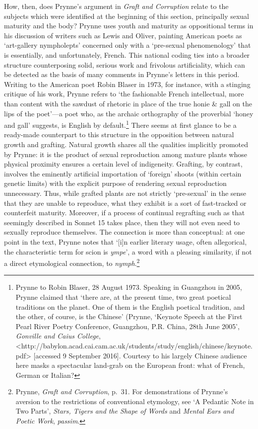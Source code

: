 \documentclass[]{article}
\begin{document}
How, then, does Prynne's argument in \emph{Graft and Corruption} relate
to the subjects which were identified at the beginning of this section,
principally sexual maturity and the body? Prynne uses youth and maturity
as oppositional terms in his discussion of writers such as Lewis and
Oliver, painting American poets as `art-gallery nympholepts' concerned
only with a `pre-sexual phenomenology' that is essentially, and
unfortunately, French. This national coding ties into a broader
structure counterposing solid, serious work and frivolous artificiality,
which can be detected as the basis of many comments in Prynne's letters
in this period. Writing to the American poet Robin Blaser in 1973, for
instance, with a stinging critique of his work, Prynne refers to `the
fashionable French intellectual, more than content with the sawdust of
rhetoric in place of the true honie \& gall on the lips of the poet'---a
poet who, as the archaic orthography of the proverbial `honey and gall'
suggests, is English by default.\footnote{Prynne to Robin Blaser, 28
  August 1973. Speaking in Guangzhou in 2005, Prynne claimed that `there
  are, at the present time, two great poetical traditions on the planet.
  One of them is the English poetical tradition, and the other, of
  course, is the Chinese' (Prynne, `Keynote Speech at the First Pearl
  River Poetry Conference, Guangzhou, P.R. China, 28th June 2005',
  \emph{Gonville and Caius College},
  \textless{}http://babylon.acad.cai.cam.ac.uk/students/study/english/chinese/keynote.pdf\textgreater{}
  {[}accessed 9 September 2016{]}. Courtesy to his largely Chinese
  audience here masks a spectacular land-grab on the European front:
  what of French, German or Italian?} There seems at first glance to be
a ready-made counterpart to this structure in the opposition between
natural growth and grafting. Natural growth shares all the qualities
implicitly promoted by Prynne: it is the product of sexual reproduction
among mature plants whose physical proximity ensures a certain level of
indigeneity. Grafting, by contrast, involves the eminently artificial
importation of `foreign' shoots (within certain genetic limits) with the
explicit purpose of rendering sexual reproduction unnecessary. Thus,
while grafted plants are not strictly `pre-sexual' in the sense that
they are unable to reproduce, what they exhibit is a sort of
fast-tracked or counterfeit maturity. Moreover, if a process of
continual regrafting such as that seemingly described in Sonnet 15 takes
place, then they will not even need to sexually reproduce themselves.
The connection is more than conceptual: at one point in the text, Prynne
notes that `{[}i{]}n earlier literary usage, often allegorical, the
characteristic term for scion is \emph{ympe}', a word with a pleasing
similarity, if not a direct etymological connection, to
\emph{nymph}.\footnote{Prynne, \emph{Graft and Corruption}, p.~31. For
  demonstrations of Prynne's aversion to the restrictions of
  conventional etymology, see `A Pedantic Note in Two Parts',
  \emph{Stars, Tigers and the Shape of Words} and \emph{Mental Ears and
  Poetic Work}, \emph{passim}.}
\end{document}
